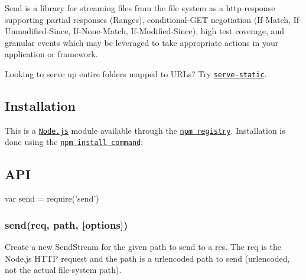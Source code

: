 \href{https://npmjs.org/package/send}{\tt } \href{https://npmjs.org/package/send}{\tt } \href{https://travis-ci.org/pillarjs/send}{\tt } \href{https://ci.appveyor.com/project/dougwilson/send}{\tt } \href{https://coveralls.io/r/pillarjs/send?branch=master}{\tt } \href{https://www.gratipay.com/dougwilson/}{\tt }

Send is a library for streaming files from the file system as a http response supporting partial responses (Ranges), conditional-\/\+G\+ET negotiation (If-\/\+Match, If-\/\+Unmodified-\/\+Since, If-\/\+None-\/\+Match, If-\/\+Modified-\/\+Since), high test coverage, and granular events which may be leveraged to take appropriate actions in your application or framework.

Looking to serve up entire folders mapped to U\+R\+Ls? Try \href{https://www.npmjs.org/package/serve-static}{\tt serve-\/static}.

\subsection*{Installation}

This is a \href{https://nodejs.org/en/}{\tt Node.\+js} module available through the \href{https://www.npmjs.com/}{\tt npm registry}. Installation is done using the \href{https://docs.npmjs.com/getting-started/installing-npm-packages-locally}{\tt {\ttfamily npm install} command}\+:




\subsection*{A\+PI}


\begin{DoxyCode}
var send = require('send')
\end{DoxyCode}


\subsubsection*{send(req, path, \mbox{[}options\mbox{]})}

Create a new {\ttfamily Send\+Stream} for the given path to send to a {\ttfamily res}. The {\ttfamily req} is the Node.\+js H\+T\+TP request and the {\ttfamily path} is a urlencoded path to send (urlencoded, not the actual file-\/system path).

